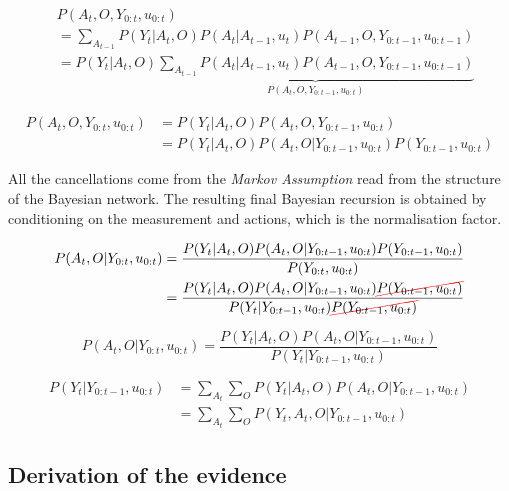 \begin{align}
  &P(A_t,O,Y_{0:t},u_{0:t}) \\
  &= \sum_{A_{t-1}} P(Y_t|A_{t},O)  P(A_t|A_{t-1},u_{t})  P(A_{t-1},O,Y_{0:t-1},u_{0:t-1}) \nonumber \\
  &= P(Y_t|A_{t},O)  \underbrace{\sum_{A_{t-1}} P(A_t|A_{t-1},u_t)  P(A_{t-1},O,Y_{0:t-1},u_{0:t-1})}_{P(A_t,O,Y_{0:t-1},u_{0:t})} 
\end{align}

\begin{align}
   P(A_t,O,Y_{0:t},u_{0:t}) &= P(Y_t|A_{t},O)  P(A_t,O,Y_{0:t-1},u_{0:t}) \nonumber \\
			    &= P(Y_t|A_{t},O)  P(A_t,O|Y_{0:t-1},u_{0:t})  P(Y_{0:t-1},u_{0:t})
\end{align}


All the cancellations come from the \textit{Markov Assumption} read from the structure of the Bayesian network.
The resulting final Bayesian recursion is obtained by conditioning on the measurement and actions, which is the normalisation factor.

\begin{align}\label{eq:ch5_measurement_update}
 P(A_t,O|Y_{0:t},u_{0:t}) &= \frac{P(Y_t|A_{t},O)  P(A_t,O|Y_{0:t-1},u_{0:t})  P(Y_{0:t-1},u_{0:t})}{P(Y_{0:t},u_{0:t})} \nonumber \\
			  &= \frac{P(Y_t|A_{t},O)  P(A_t,O|Y_{0:t-1},u_{0:t})  \Ccancel[red]{P(Y_{0:t-1},u_{0:t})}}{P(Y_t|Y_{0:t-1},u_{0:t}) \Ccancel[red]{P(Y_{0:t-1},u_{0:t})}}  
\end{align}
 
\begin{equation}
   P(A_t,O|Y_{0:t},u_{0:t}) = \frac{P(Y_t|A_{t},O) P(A_{t},O|Y_{0:t-1},u_{0:t})}{P(Y_t|Y_{0:t-1},u_{0:t})} 
\end{equation}


\begin{align}
 P(Y_t|Y_{0:t-1},u_{0:t}) &= \sum\limits_{A_t} \sum\limits_O  P(Y_t|A_{t},O) P(A_{t},O|Y_{0:t-1},u_{0:t}) \\
			  &= \sum\limits_{A_t} \sum\limits_O  P(Y_t,A_{t},O|Y_{0:t-1},u_{0:t})
\end{align}



\subsection{Derivation of the evidence}\label{appendix:evidence}

